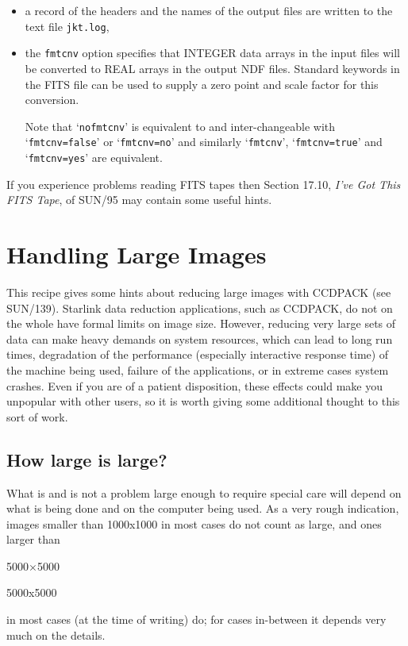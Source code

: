 \documentclass[twoside,11pt]{article}
\newcommand{\xref}[3]{#1}
\newcommand{\xlabel}[1]{}
\begin{document}
\begin{description}
\begin{itemize}
    \item a record of the headers and the names of the output files are
     written to the text file {\tt jkt.log},

    \item the {\tt fmtcnv} option specifies that INTEGER data arrays
     in the input files will be converted to REAL arrays in the output
     NDF files.  Standard keywords in the FITS file can be used to supply
     a zero point and scale factor for this conversion.

     Note that `{\tt nofmtcnv}' is equivalent to and inter-changeable with
     `{\tt fmtcnv=false}' or `{\tt fmtcnv=no}' and similarly `{\tt fmtcnv}',
     `{\tt fmtcnv=true}' and `{\tt fmtcnv=yes}' are equivalent.

  \end{itemize}

\end{description}

If you experience problems reading FITS tapes then Section 17.10, 
\xref{{\it I've Got This FITS Tape}}{sun95}{se_fitsunixtape},
of \xref{SUN/95}{sun95}{}\/\cite{SUN95} may contain some useful hints.


\newpage
\section{\xlabel{LARGE}\label{LARGE}Handling Large Images}


This recipe gives some hints about reducing large images with CCDPACK
(see \xref{SUN/139}{sun139}{}\/\cite{SUN139}).
Starlink data reduction applications, such as CCDPACK, do not on the whole
have formal limits on image size.  However,
reducing very large sets of data can make heavy demands 
on system resources, which
can lead to long run times, degradation of the performance
(especially interactive response time)
of the machine being used,
failure of the applications,
or in extreme cases system crashes.
Even if you are of a patient disposition, 
these effects could make you unpopular with other users,
so it is worth giving some additional thought to this sort of work.

\subsection{\xlabel{HOWLARGE}How large is large?}

What is and is not a problem large enough to require special care
will depend on what is being done and on
the computer being used.
As a very rough indication, images smaller than 1000x1000
in most cases do not
count as large, and ones larger than 
\begin{latex} 
5000$\times$5000 
\end{latex}
\begin{htmlonly} 
5000x5000 
\end{htmlonly}
in most cases (at the time of writing) do;
for cases in-between it depends very much on the details.
\end{document}

